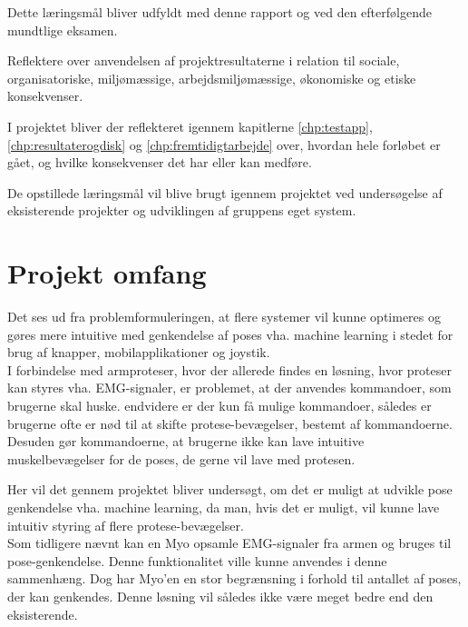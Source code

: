 \begin{myItemize}
	\begin{myItemize}
		\item Dette læringsmål bliver udfyldt med denne rapport og ved den efterfølgende mundtlige eksamen.
	\end{myItemize}
	\item Reflektere over anvendelsen af projektresultaterne i relation til sociale, organisatoriske, miljømæssige, arbejdsmiljømæssige, økonomiske og etiske konsekvenser.
	\begin{myItemize}
		\item I projektet bliver der reflekteret igennem kapitlerne \ref{chp:testapp}, \ref{chp:resultaterogdisk} og \ref{chp:fremtidigtarbejde} over, hvordan hele forløbet er gået, og hvilke konsekvenser det har eller kan medføre.
	\end{myItemize}
\end{myItemize}

De opstillede læringsmål vil blive brugt igennem projektet ved undersøgelse af eksisterende projekter og udviklingen af gruppens eget system.\\


\section{Projekt omfang}
Det ses ud fra problemformuleringen, at flere systemer vil kunne optimeres og gøres mere intuitive med genkendelse af poses vha. machine learning i stedet for brug af knapper, mobilapplikationer og joystik. \\

I forbindelse med armproteser, hvor der allerede findes en løsning, hvor proteser kan styres vha. EMG-signaler, er problemet, at der anvendes kommandoer, som brugerne skal huske. endvidere er der kun få mulige kommandoer, således er brugerne ofte er nød til at skifte protese-bevægelser, bestemt af kommandoerne. Desuden gør kommandoerne, at brugerne ikke kan lave intuitive muskelbevægelser for de poses, de gerne vil lave med protesen. 

Her vil det gennem projektet bliver undersøgt, om det er muligt at udvikle pose genkendelse vha. machine learning, da man, hvis det er muligt, vil kunne lave intuitiv styring af flere protese-bevægelser. \\
Som tidligere nævnt kan en Myo opsamle EMG-signaler fra armen og bruges til pose-genkendelse. Denne funktionalitet ville kunne anvendes i denne sammenhæng. Dog har Myo'en en stor begrænsning i forhold til antallet af poses, der kan genkendes. Denne løsning vil således ikke være meget bedre end den eksisterende.\\

